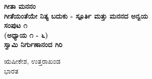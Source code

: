 \begin{titlepage}
    \begin{center}
        \vspace*{0.5cm}
            
        {\Huge
        \textbf{\bookTitleColor\fontsize{50}{60}\selectfont ಗೀತಾ ಮನನಂ}}
        \textbf{\\ \small \color{black}ಗೀತೆಯಂತೆಯೇ ನಿತ್ಯ ಬದುಕು - ಸ್ಪೂರ್ತಿ ಮತ್ತು ಮನನದ ಅನ್ವಯ}\\ 
		\vspace{1.0cm}
		\textbf{{\large \color{black} ಸಂಪುಟ ೧}\\{\normalsize \color{black} (ಅಧ್ಯಾಯ ೧ - ೬)}}\\		
        \vspace{6.0cm}
        \textbf{{\Large \bookAuthColor\mananamfont ಸ್ವಾಮಿ ನಿರ್ಗುಣಾನಂದ ಗಿರಿ}}\\
        
		
            
        \vfill
            
        
            
        \vspace{0.1cm}
        {\color{black}    
		
		{{\large \color{black}ಋಷೀಕೇಶ, ಉತ್ತರಾಖಂಡ}\\\normalsize ಭಾರತ}
        }
    \end{center}
\end{titlepage}
\nopagecolor%